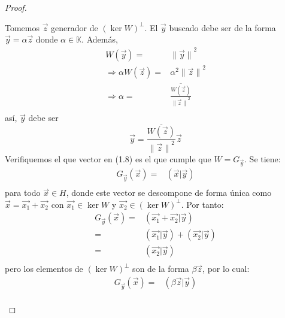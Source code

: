 \documentclass[12pt]{report}
\theoremstyle{largebreak}
\newcommand\norm[1]{\ensuremath{\|#1\|}}
\newcommand\pint[2]{\ensuremath{\left(#1\big| #2\right)}}
\newcommand\conj[1]{\ensuremath{\overline{#1}}}
\begin{document}
\begin{proof}
\begin{enumerate}
            Tomemos $\vec{z}$ generador de $\left(\ker W\right)^\perp$. El $\vec{y}$ buscado debe ser de la forma $\vec{y}=\alpha\vec{z}$ donde $\alpha\in\mathbb{K}$. Además,
            \begin{equation*}
                \begin{split}
                    W(\vec{y})=&\norm{\vec{y}}^2\\
                    \Rightarrow \alpha W(\vec{z})=&\alpha^2\norm{\vec{z}}^2\\
                    \Rightarrow \alpha=&\conj{\frac{W(\vec{z})}{\norm{\vec{z}}^2}}\\
                \end{split}
            \end{equation*}
            así, $\vec{y}$ debe ser
            \begin{equation}
                \vec{y}=\conj{\frac{W(\vec{z})}{\norm{\vec{z}}^2}}\vec{z}
            \end{equation}
            Verifiquemos el que vector en (1.8) es el que cumple que $W=G_{\vec{y}}$. Se tiene:
            \begin{equation*}
                \begin{split}
                    G_{\vec{y}}(\vec{x})=&\pint{\vec{x}}{\vec{y}} \\
                \end{split}
            \end{equation*}
            para todo $\vec{x}\in H$, donde este vector se descompone de forma única como $\vec{x}=\vec{x_1}+\vec{x_2}$ con $\vec{x_1}\in\ker W$ y $\vec{x_2}\in\left(\ker W\right)^\perp$. Por tanto:
            \begin{equation*}
                \begin{split}
                    G_{\vec{y}}(\vec{x})=&\pint{\vec{x_1}+\vec{x_2}}{\vec{y}} \\
                    =&\pint{\vec{x_1}}{\vec{y}}+\pint{\vec{x_2}}{\vec{y}} \\
                    =&\pint{\vec{x_2}}{\vec{y}} \\
                \end{split}
            \end{equation*}
            pero los elementos de $\left(\ker W\right)^\perp$ son de la forma $\beta\vec{z}$, por lo cual:\begin{equation*}
                \begin{split}
                    G_{\vec{y}}(\vec{x})=&\pint{\beta\vec{z}}{\vec{y}} \\

\end{split}
\end{equation*}
\end{enumerate}
\end{proof}
\end{document}
